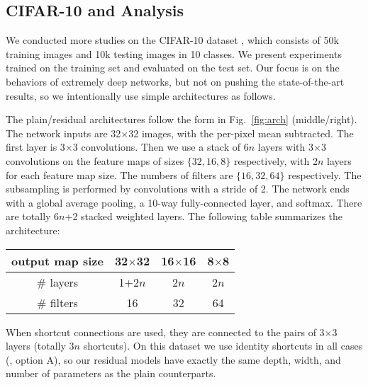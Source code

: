 \subsection{CIFAR-10 and Analysis}

We conducted more studies on the CIFAR-10 dataset \cite{Krizhevsky2009}, which consists of 50k training images and 10k testing images in 10 classes. We present experiments trained on the training set and evaluated on the test set.
Our focus is on the behaviors of extremely deep networks, but not on pushing the state-of-the-art results, so we intentionally use simple architectures as follows.

The plain/residual architectures follow the form in Fig.~\ref{fig:arch} (middle/right).
The network inputs are 32$\times$32 images, with the per-pixel mean subtracted. The first layer is 3$\times$3 convolutions. Then we use a stack of $6n$ layers with 3$\times$3 convolutions on the feature maps of sizes $\{32, 16, 8\}$ respectively, with 2$n$ layers for each feature map size. The numbers of filters are $\{16, 32, 64\}$ respectively. The subsampling is performed by convolutions with a stride of 2. The network ends with a global average pooling, a 10-way fully-connected layer, and softmax. There are totally 6$n$+2 stacked weighted layers. The following table summarizes the architecture:
\renewcommand\arraystretch{1.1}
\begin{center}
\small
\setlength{\tabcolsep}{8pt}
\begin{tabular}{c|c|c|c}
\hline
output map size & 32$\times$32 & 16$\times$16 & 8$\times$8 \\
\hline
\# layers & 1+2$n$ & 2$n$ & 2$n$\\
\# filters & 16 & 32 & 64\\
\hline
\end{tabular}
\end{center}
When shortcut connections are used, they are connected to the pairs of 3$\times$3 layers (totally $3n$ shortcuts). On this dataset we use identity shortcuts in all cases (\ie, option A), so our residual models have exactly the same depth, width, and number of parameters as the plain counterparts.

